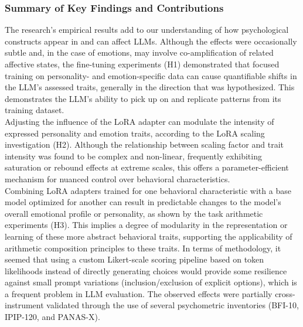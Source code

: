 \documentclass{DESSThesis}
\begin{document}
\subsubsection{Summary of Key Findings and Contributions}
The research's empirical results add to our understanding of how psychological constructs appear in and can affect LLMs. Although the effects were occasionally subtle and, in the case of emotions, may involve co-amplification of related affective states, the fine-tuning experiments (H1) demonstrated that focused training on personality- and emotion-specific data can cause quantifiable shifts in the LLM's assessed traits, generally in the direction that was hypothesized. This demonstrates the LLM's ability to pick up on and replicate patterns from its training dataset.
\\
Adjusting the influence of the LoRA adapter can modulate the intensity of expressed personality and emotion traits, according to the LoRA scaling investigation (H2). Although the relationship between scaling factor and trait intensity was found to be complex and non-linear, frequently exhibiting saturation or rebound effects at extreme scales, this offers a parameter-efficient mechanism for nuanced control over behavioral characteristics.
\\
Combining LoRA adapters trained for one behavioral characteristic with a base model optimized for another can result in predictable changes to the model's overall emotional profile or personality, as shown by the task arithmetic experiments (H3). This implies a degree of modularity in the representation or learning of these more abstract behavioral traits, supporting the applicability of arithmetic composition principles to these traits.
In terms of methodology, it seemed that using a custom Likert-scale scoring pipeline based on token likelihoods instead of directly generating choices would provide some resilience against small prompt variations (inclusion/exclusion of explicit options), which is a frequent problem in LLM evaluation. The observed effects were partially cross-instrument validated through the use of several psychometric inventories (BFI-10, IPIP-120, and PANAS-X).
\end{document}
